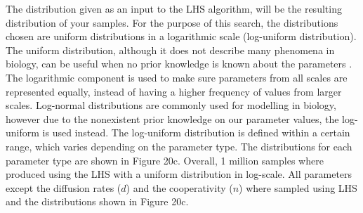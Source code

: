 The distribution given as an input to the LHS algorithm, will be the resulting distribution of your samples. For the purpose of this search, the distributions chosen are uniform distributions in a logarithmic scale (log-uniform distribution). The uniform distribution, although it does not describe many phenomena in biology, can be useful when no prior knowledge is known about the parameters \parencite{Frank2009}. The logarithmic component is used to make sure parameters from all scales are represented equally, instead of having a higher frequency of values from larger scales. Log-normal distributions are commonly used for modelling in biology, however due to the nonexistent prior knowledge on our parameter values, the log-uniform is used instead. The log-uniform distribution is defined within a certain range, which varies depending on the parameter type. The distributions for each parameter type are shown in Figure 20c. Overall, 1 million samples where produced using the LHS with a uniform distribution in log-scale. All parameters except the diffusion rates ($d$) and the cooperativity ($n$) where sampled using LHS and the distributions shown in Figure 20c.


